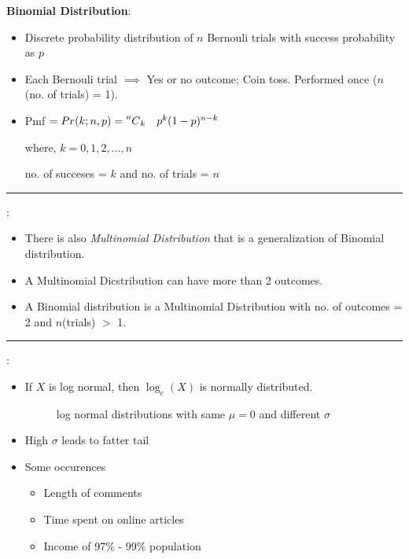 \documentclass[	DIV=calc,%
paper=a4,%
fontsize=11pt,%
twocolumn]{scrartcl} %
\newcommand{\hformbar}[1]{\vspace{5pt}\hrule\vspace{10pt}} %
\newcommand{\formdesc}[1]{\noindent\textbf{#1}}
\begin{document}
\formdesc{Binomial Distribution}:
\newcommand\Mycomb[2][^n]{\prescript{#1\mkern-0.5mu}{}C_{#2}}
\begin{itemize}
	\item Discrete probability distribution of $n$ Bernouli trials with success probability as $p$
	\item Each Bernouli trial $\implies$ Yes or no outcome; Coin toss. Performed once ($n$ (no. of trials) = 1).

	\item Pmf \begin{math}
		 = Pr(k;n,p) = \Mycomb[n]{k}\quad  p^k (1-p)^{n-k}
	\end{math}
	
	where, $k = {0, 1, 2, ..., n}$ 
	
	no. of succeses = $k$ and no. of trials = $n$
	
\end{itemize}


\hformbar

\formdesc{Multinomial Distribution}:
\begin{itemize}
		\item There is also \emph{Multinomial Distribution} that is a generalization of Binomial distribution.
		
		\item A Multinomial Dicstribution can have more than 2 outcomes.
		
		\item A Binomial distribution is a Multinomial Distribution with no. of outcomes = 2 and $n$(trials) $>$ 1.
		
\end{itemize}

\hformbar

\formdesc{Log-normal distribution}:
	\begin{itemize}
		\item If $X$ is log normal, then $\log_e(X)$ is normally distributed.
			\begin{figure}[ht!]
			\centering
			\graphicspath{ {images/math/} }
			\caption{log normal distributions with same $\mu=0$ and different $\sigma$}
			
		\end{figure}
	\item High $\sigma$ leads to fatter tail
	\item Some occurences
		\begin{itemize}
			\item Length of comments
			\item Time spent on online articles
			\item Income of 97\% - 99\% population
		\end{itemize}
	\end{itemize}
\end{document}
